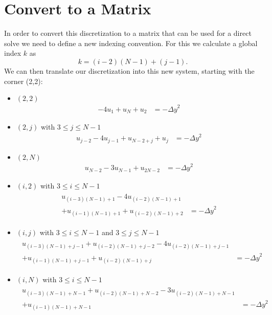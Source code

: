 \documentclass[10pt]{article}
\begin{document}
	\section{Convert to a Matrix}
	In order to convert this discretization to a matrix that can be used for a direct solve we need to define a new indexing convention. For this we calculate a global index $ k $ as
	\begin{equation}
		k = (i-2)(N-1) + (j-1).
	\end{equation}
	We can then translate our discretization into this new system, starting with the corner (2,2):
	\begin{itemize}
		\item $ (2,2) $
		\begin{align*}
			- 4u_1 + u_{N} + u_2 &= -{\Delta y}^2
		\end{align*}
		\item $ (2,j) $ with $ 3\leq j\leq N-1 $
		\begin{align*}
			u_{j-2} - 4u_{j-1} + u_{N-2+j} + u_j &= -{\Delta y}^2
		\end{align*}
		\item $ (2,N) $
		\begin{align*}
			u_{N-2} - 3u_{N-1} + u_{2N-2} &= -{\Delta y}^2
		\end{align*}
		\item $ (i,2) $ with $ 3\leq i\leq N-1 $
		\begin{align*}
			\begin{split}
				u_{(i-3)(N-1)+1} - 4u_{(i-2)(N-1)+1} \\+ u_{(i-1)(N-1)+1} + u_{(i-2)(N-1)+2} &= -{\Delta y}^2
			\end{split}
		\end{align*}
		\item $ (i,j) $ with $ 3\leq i\leq N-1 $ and $ 3\leq j\leq N-1 $
		\begin{align*}
			\begin{split}
				u_{(i-3)(N-1)+j-1} + u_{(i-2)(N-1)+j-2} - 4u_{(i-2)(N-1)+j-1}\\ + u_{(i-1)(N-1)+j-1} + u_{(i-2)(N-1)+j}& = -{\Delta y}^2
			\end{split}
		\end{align*}
		\item $ (i,N) $ with $ 3\leq i\leq N-1 $
		\begin{align*}
			\begin{split}
				u_{(i-3)(N-1)+N-1} + u_{(i-2)(N-1)+N-2} - 3u_{(i-2)(N-1)+N-1} \\+ u_{(i-1)(N-1)+N-1} &= -{\Delta y}^2

\end{split}
\end{align*}
\end{itemize}
\end{document}
